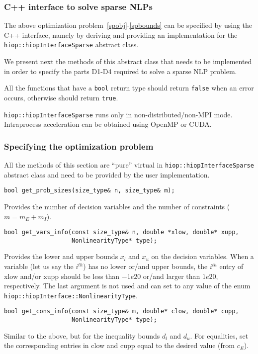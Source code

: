 \subsubsection{C++ interface to solve sparse NLPs}
The above optimization problem~\eqref{spobj}-\eqref{spbounds} can be specified by using the C++ interface, namely by deriving and providing an implementation for the \texttt{hiop::hiopInterfaceSparse} abstract class.

 We present next the methods of this abstract class that needs to be implemented in order to specify the parts D1-D4 required to solve a sparse NLP  problem. 

 All the functions that have a \texttt{bool} return type should return \texttt{false} when an error occurs, otherwise should return \texttt{true}.

 \texttt{hiop::hiopInterfaceSparse} runs only in non-distributed/non-MPI mode. Intraprocess acceleration can be obtained using OpenMP or CUDA.

\subsubsection{Specifying the optimization problem}

All the methods of this section are ``pure'' virtual in \texttt{hiop::hiopInterfaceSparse} abstract class  and need to be provided by the user implementation.

\begin{lstlisting} 
bool get_prob_sizes(size_type& n, size_type& m);
\end{lstlisting} 
\noindent Provides the number of decision variables and the number of constraints ($m=m_E+m_I$).


\begin{lstlisting} 
bool get_vars_info(const size_type& n, double *xlow, double* xupp, 
                   NonlinearityType* type);
\end{lstlisting} 

\noindent Provides the lower and upper bounds $x_l$ and $x_u$ on the decision variables. When a variable (let us say the $i^{th}$) has no lower or/and upper bounds, the  $i^{th}$ entry of xlow and/or xupp should be less than $-1e20$ or/and larger than $1e20$, respectively. The last argument is not used and can set to any value of the enum \texttt{hiop::hiopInterface::NonlinearityType}.

\begin{lstlisting} 
bool get_cons_info(const size_type& m, double* clow, double* cupp, 
                   NonlinearityType* type);
\end{lstlisting}
\noindent Similar to the above, but for the inequality bounds $d_l$ and $d_u$. For equalities, set the corresponding entries in clow and cupp equal to the desired value (from $c_E$).


